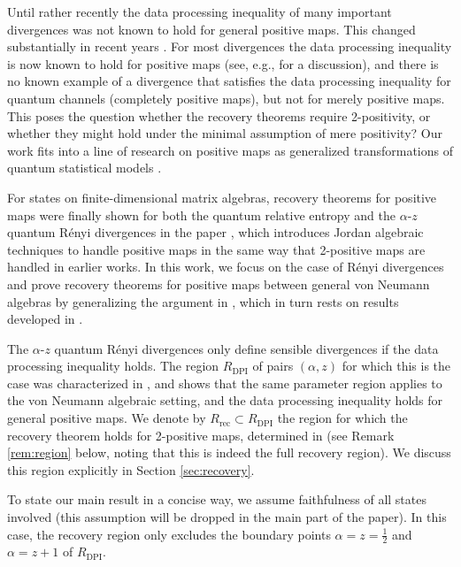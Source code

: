 \documentclass[12pt]{article}
\theoremstyle{definition}
\theoremstyle{remark}
\begin{document}
Until rather recently the data processing inequality of many important divergences was not known to hold for general positive maps.
This changed substantially in recent years
\cite{mullerhermes2017monotonicity,frenkel_integral_2023,hiai2024alphaz}.
For most divergences the data processing inequality is now known to hold for positive maps (see, e.g., \cite[Appendix E]{galke_sufficiency_2024} for a discussion), and there is no known example of a divergence that satisfies the data processing inequality for quantum channels (completely positive maps), but not for merely positive maps.
This poses the question whether the recovery theorems require 2-positivity, or whether they might hold under the minimal assumption of mere positivity?
Our work fits into a line of research on positive maps as generalized transformations of quantum statistical models \cite{alberti_problem_1980,mullerhermes2017monotonicity,galke_sufficiency_2024,frenkel_integral_2023,luijk2026sufficiency,luijk_quantum_2026}.

For states on finite-dimensional matrix algebras, recovery theorems for positive maps were finally shown for both the quantum relative entropy and the $\alpha$-$z$ quantum R\'enyi divergences in the paper \cite{luijk2026sufficiency}, which introduces Jordan algebraic techniques to handle positive maps in the same way that 2-positive maps are handled in earlier works. 
In this work, we focus on the case of R\'enyi divergences and prove recovery theorems for
positive maps between general von Neumann algebras by generalizing the argument in
\cite{luijk2026sufficiency}, which in turn rests on results developed in
\cite{jencova2018renyi,jencova2021renyi,hiai2024alphaz}. 

The $\alpha$-$z$ quantum R\'enyi divergences only define sensible divergences if the data processing inequality holds.
The region $R_{\text{DPI}}$ of pairs $(\alpha,z)$ for which this is the case was
characterized in \cite{zhang2020fromwyd}, and \cite{hiai2024alphaz} shows that the same
parameter region applies to the von Neumann algebraic setting, and the data processing inequality holds for general positive maps.
We denote by $R_{\text{rec}}\subset R_{\text{DPI}}$ the region for which the recovery
theorem holds for 2-positive maps, determined in \cite{hiai2024alphaz} (see Remark  \ref{rem:region} below, noting that this is indeed the full recovery region). We discuss this region explicitly in Section \ref{sec:recovery}.

To state our main result in a concise way, we assume faithfulness of all states involved
(this assumption will be dropped in the main part of the paper). 
In this case, the
recovery region only excludes the boundary points $\alpha=z=\frac12$ and $\alpha=z+1$ of $R_{\text{DPI}}$.
\end{document}
